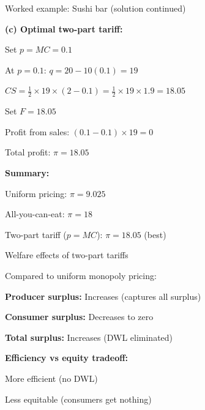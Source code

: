 \documentclass[notes,11pt, aspectratio=169]{beamer}
\newenvironment{wideitemize}{\itemize\addtolength{\itemsep}{10pt}}{\enditemize}
\begin{document}
\begin{frame}{Worked example: Sushi bar (solution continued)}
	\begin{wideitemize}
		\item \textbf{(c) Optimal two-part tariff:}
		\begin{wideitemize}
			\vspace{3pt}
			\item Set $p = MC = 0.1$
			\item At $p = 0.1$: $q = 20 - 10(0.1) = 19$
			\item $CS = \frac{1}{2} \times 19 \times (2 - 0.1) = \frac{1}{2} \times 19 \times 1.9 = 18.05$
			\item Set $F = 18.05$
			\item Profit from sales: $(0.1 - 0.1) \times 19 = 0$
			\item Total profit: $\pi = 18.05$
		\end{wideitemize}
		\item \textbf{Summary:}
		\begin{wideitemize}
			\vspace{3pt}
			\item Uniform pricing: $\pi = 9.025$
			\item All-you-can-eat: $\pi = 18$
			\item Two-part tariff ($p = MC$): $\pi = 18.05$ (best)
		\end{wideitemize}
	\end{wideitemize}
\end{frame}

\begin{frame}{Welfare effects of two-part tariffs}
	\begin{wideitemize}
		\item Compared to uniform monopoly pricing:
		\item \textbf{Producer surplus:} Increases (captures all surplus)
		\item \textbf{Consumer surplus:} Decreases to zero
		\item \textbf{Total surplus:} Increases (DWL eliminated)
		\item \textbf{Efficiency vs equity tradeoff:}
		\begin{wideitemize}
			\vspace{5pt}
			\item More efficient (no DWL)
			\item Less equitable (consumers get nothing)
		\end{wideitemize}
	\end{wideitemize}
\end{frame}
\end{document}
